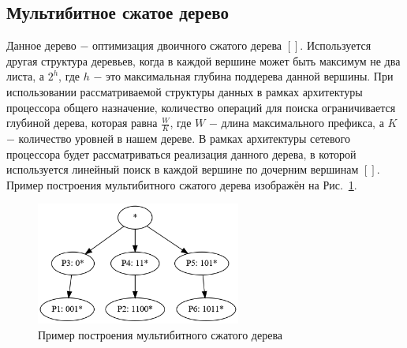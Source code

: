 \documentclass[a4paper, 12pt, titlepage, finall]{extreport}
\begin{document}
        \subsection{Мультибитное сжатое дерево}
            Данное дерево $-$ оптимизация двоичного сжатого дерева $[ ]$. Используется другая структура деревьев, когда в каждой вершине
            может быть максимум не два листа, а {\ttfamily $2^h$}, где {\ttfamily $h$} $-$ это максимальная глубина поддерева данной вершины.
            При использовании рассматриваемой структуры данных в рамках архитектуры процессора общего назначение, количество операций для поиска ограничивается глубиной дерева,
            которая равна {\ttfamily $\frac{W}{K}$}, где {\ttfamily $W$} $-$ длина максимального префикса, а {\ttfamily $K$} $-$ количество уровней в нашем дереве.
            В рамках архитектуры сетевого процессора будет рассматриваться реализация данного дерева, в которой используется линейный поиск в каждой вершине по дочерним вершинам $[ ]$.
            Пример построения мультибитного сжатого дерева изображён на Рис.~\ref{fig:mesh3}.
            \begin{figure}[h]
                \centering
                \includegraphics[width=0.6\textwidth]{multybit_compressed.png}
                \caption{Пример построения мультибитного сжатого дерева}\label{fig:mesh3}
            \end{figure}
\end{document}
